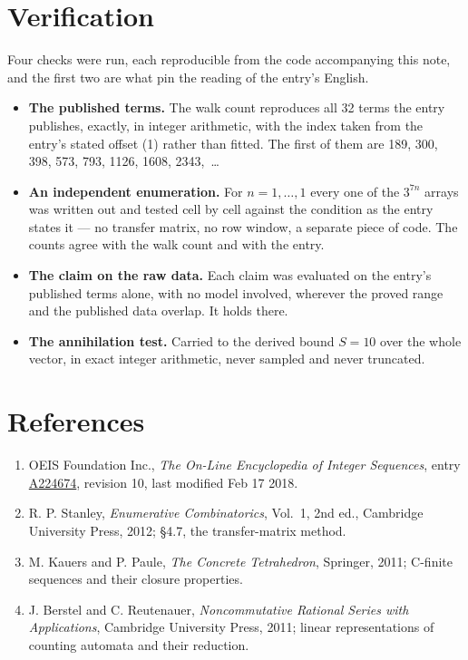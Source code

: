 \documentclass[11pt]{article}
\theoremstyle{definition}
\begin{document}
\section{Verification}

Four checks were run, each reproducible from the code accompanying this note, and the first two are what pin the reading of the entry's English.

\begin{itemize}

\item {\bfseries The published terms.} The walk count reproduces all 32 terms the entry publishes, exactly, in integer arithmetic, with the index taken from the entry's stated offset (1) rather than fitted. The first of them are 189, 300, 398, 573, 793, 1126, 1608, 2343,~\dots

\item {\bfseries An independent enumeration.} For $n = 1,\dots,1$ every one of the $3^{7n}$ arrays was written out and tested cell by cell against the condition as the entry states it --- no transfer matrix, no row window, a separate piece of code. The counts agree with the walk count and with the entry.

\item {\bfseries The claim on the raw data.} Each claim was evaluated on the entry's published terms alone, with no model involved, wherever the proved range and the published data overlap. It holds there.

\item {\bfseries The annihilation test.} Carried to the derived bound $S = 10$ over the whole vector, in exact integer arithmetic, never sampled and never truncated.

\end{itemize}

\section{References}

\begin{enumerate}

\item OEIS Foundation Inc., \emph{The On-Line Encyclopedia of Integer Sequences}, entry \href{https://oeis.org/A224674}{A224674}, revision 10, last modified Feb 17 2018.

\item R. P. Stanley, \emph{Enumerative Combinatorics}, Vol.~1, 2nd ed., Cambridge University Press, 2012; \S4.7, the transfer-matrix method.

\item M. Kauers and P. Paule, \emph{The Concrete Tetrahedron}, Springer, 2011; C-finite sequences and their closure properties.

\item J. Berstel and C. Reutenauer, \emph{Noncommutative Rational Series with Applications}, Cambridge University Press, 2011; linear representations of counting automata and their reduction.

\end{enumerate}
\end{document}

